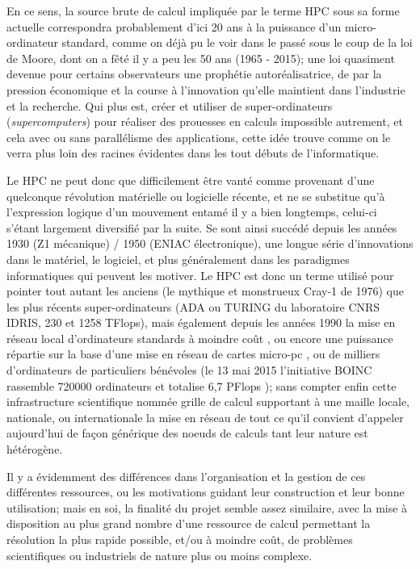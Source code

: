 En ce sens, la source brute de calcul impliquée par le terme HPC sous sa forme actuelle correspondra probablement d'ici 20 ans à la puissance d'un micro-ordinateur standard, comme on déjà pu le voir dans le passé sous le coup de la loi de Moore, dont on a fêté il y a peu les 50 ans (1965 - 2015); une loi quasiment devenue pour certains observateurs une prophétie autoréalisatrice, de par la pression économique et la course à l'innovation qu'elle maintient dans l'industrie et la recherche. Qui plus est, créer et utiliser de super-ordinateurs (\textit{supercomputers}) pour réaliser des prouesses en calculs impossible autrement, et cela avec ou sans parallélisme des applications, cette idée trouve comme on le verra plus loin des racines évidentes dans les tout débuts de l'informatique.

Le HPC ne peut donc que difficilement être vanté comme provenant d'une quelconque révolution matérielle ou logicielle récente, et ne se substitue qu'à l'expression logique d'un mouvement entamé il y a bien longtemps, celui-ci s'étant largement diversifié par la suite. Se sont ainsi succédé depuis les années 1930 (Z1 mécanique) / 1950 (ENIAC électronique), une longue série d'innovations dans le matériel, le logiciel, et plus généralement dans les paradigmes informatiques qui peuvent les motiver. Le HPC est donc un terme utilisé pour pointer tout autant les anciens (le mythique et monstrueux Cray-1 de 1976) que les plus récents super-ordinateurs (ADA ou TURING du laboratoire CNRS IDRIS, 230 et 1258 TFlops), mais également depuis les années 1990 la mise en réseau local d'ordinateurs standards à moindre coût , ou encore une puissance répartie sur la base d'une mise en réseau de cartes micro-pc , ou de milliers d'ordinateurs de particuliers bénévoles (le 13 mai 2015 l'initiative BOINC rassemble 720000 ordinateurs et totalise 6,7 PFlops ); sans compter enfin cette infrastructure scientifique nommée grille de calcul supportant à une maille locale, nationale, ou internationale la mise en réseau de tout ce qu'il convient d'appeler aujourd'hui de façon générique des noeuds de calculs tant leur nature est hétérogène.

Il y a évidemment des différences dans l'organisation et la gestion de ces différentes ressources, ou les motivations guidant leur construction et leur bonne utilisation; mais en soi, la finalité du projet semble assez similaire, avec la mise à disposition au plus grand nombre d'une ressource de calcul permettant la résolution la plus rapide possible, et/ou à moindre coût, de problèmes scientifiques ou industriels de nature plus ou moins complexe.

